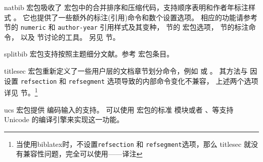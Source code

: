 \begin{marglist}
\item[natbib]
 宏包吸收了 宏包中的合并排序和压缩代码，支持顺序表明和作者年标注样式 。
它也提供了一些额外的标注(引用)命令和数个设置选项。
相应的功能请参考  节的 \texttt{numeric} 和 \texttt{author-year} 引用样式及其变种，
 节的  宏包选项， 节的标注命令，
以及  节讨论的工具。
另见  节。

\item[splitbib]
 宏包支持按照主题细分文献。参考  宏包条目。

\item[titlesec]
 宏包重新定义了一些用户层的文档章节划分命令，例如  或 。
其方法与 \biblatex 因设置 \texttt{refsection} 和 \texttt{refsegment} 选项导致的内部命令变化不兼容，
上述两个选项详见 节。\footnote{当使用biblatex时，不设置\texttt{refsection} 和 \texttt{refsegment}选项，那么 titlesec 就没有兼容性问题，完全可以使用——译注}

\item[ucs]
 宏包提供 \utf 编码输入的支持。
可以使用  宏包的标准  模块或者 \XeTeX 、\LuaTeX 等支持 Unicode 的编译引擎来实现这一功能。


\end{marglist}
